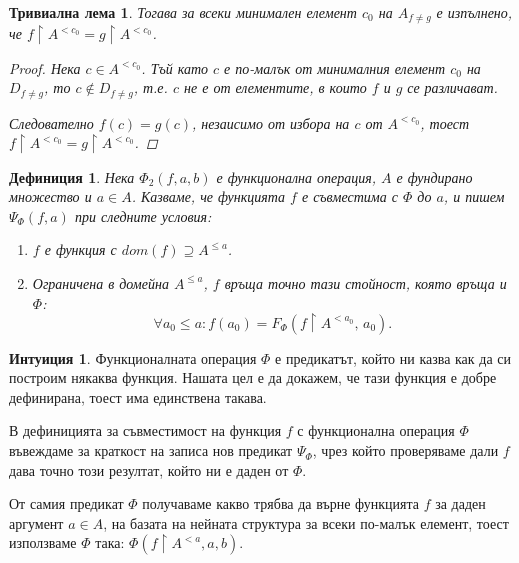 \documentclass{article}
\newtheorem{tlemma}{Тривиална лема}
\newtheorem{deff}{Дефиниция}
\theoremstyle{definition}
\newtheorem{intuit}{Интуиция}
\begin{document}
\begin{multicols}{2}
\begin{tlemma}
    Тогава за всеки минимален елемент $c_0$ на $A_{f\not=g}$ е изпълнено, че \(f \upharpoonright A^{<c_0} = g \upharpoonright A^{<c_0}\).
    \begin{proof}
        Нека $c \in A^{< c_0}$.
        Тъй като $c$ е по-малък от минималния елемент $c_0$ на $ D_{f \ne g} $, то $c \not \in D_{f \ne g}$, т.е. $c$ не е от елементите, в които $f$ и $g$ се различават.

        Следователно $f(c) = g(c)$, незаисимо от избора на $c$ от $A^{<c_0}$, тоест
        \({f \upharpoonright A^{<c_0} = g \upharpoonright A^{<c_0}}\).
    \end{proof}
\end{tlemma}

\begin{deff}
    Нека $\Phi_2(f,a,b)$ е функционална операция, $A$ е фундирано множество и $a \in A$.
    Казваме, че функцията \emph{$f$ е съвместима с $\Phi$ до $a$}, и пишем $\Psi_\Phi(f,a)$ при следните условия:
    \begin{enumerate}[noitemsep]
        \item $f$ е функция с $dom(f) \supseteq A^{\le{a}}$.
        \item Ограничена в домейна $A^{\le{a}}$, $f$ връща точно тази стойност, която връща и $\Phi$:
            \vspace{-6pt}
            \[{\forall a_0\!\le\!a: f(a_0) = F_\Phi( f\upharpoonright A^{< a_0},\, a_0 )}.\]
    \end{enumerate}
\end{deff}

\columnbreak

{\small
    \begin{intuit}
        Функционалната операция $\Phi$ е предикатът, който ни казва как да си построим някаква функция. Нашата цел е да докажем, че тази функция е добре дефинирана, тоест има единствена такава.

        В дефиницията за съвместимост на функция $f$ с функционална операция $\Phi$ въвеждаме за краткост на записа нов предикат $\Psi_\Phi$, чрез който проверяваме дали $f$ дава точно този резултат, който ни е даден от $\Phi$.

        От самия предикат $\Phi$ получаваме какво трябва да върне функцията $f$ за даден аргумент $a\!\in\!A$, на базата на нейната структура за всеки по-малък елемент,
        тоест използваме $\Phi$ така: ${\Phi(f \upharpoonright A^{<a},a,b)}$.
    \end{intuit}
}


\end{multicols}
\end{document}
